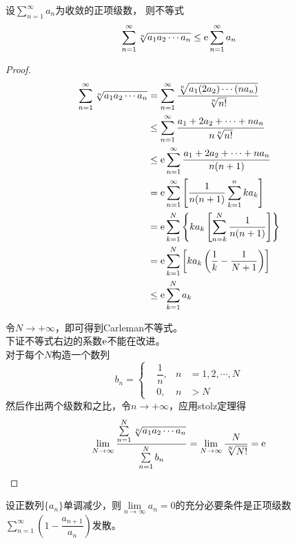 \begin{proposition}[Carleman不等式]

    设$\sum\limits_{n = 1}^{\infty}{a_n}$为收敛的正项级数，
    则不等式
    $$\sum\limits_{n = 1}^{\infty}{\sqrt[n]{a_1 a_2 \cdots a_n}} \leq \mathrm{e} \sum\limits_{n = 1}^{\infty}{a_n}$$

\end{proposition}

\begin{proof}

    \begin{align*}
        \sum\limits_{n = 1}^{\infty}{\sqrt[n]{a_1 a_2 \cdots a_n}} & = \sum\limits_{n = 1}^{\infty}{\dfrac{\sqrt[n]{a_1 (2a_2) \cdots (na_n)}}{\sqrt[n]{n!}}} \\
        & \leq \sum\limits_{n = 1}^{\infty}{\dfrac{a_1 + 2a_2 + \cdots + na_n}{n\sqrt[n]{n!}}} \\
        & \leq \mathrm{e} \sum\limits_{n = 1}^{\infty}{\dfrac{a_1 + 2a_2 + \cdots + na_n}{n(n + 1)}} \\
        & = \mathrm{e} \sum\limits_{n = 1}^{\infty}{\left[ \dfrac{1}{n(n + 1)} \sum\limits_{k = 1}^{n}{ka_k} \right]} \\
        & = \mathrm{e} \sum\limits_{k = 1}^{N}{\left\{ ka_k\left[ \sum\limits_{n = k}^{N}{\dfrac{1}{n(n + 1)}} \right] \right\}} \\
        & = \mathrm{e} \sum\limits_{k = 1}^{N}{\left[ ka_k \left(\dfrac{1}{k} - \dfrac{1}{N + 1} \right) \right]} \\
        & \leq \mathrm{e} \sum\limits_{k = 1}^{N}{a_k}
    \end{align*}

    令$N\to+\infty$，即可得到\textup{Carleman}不等式。\\
    下证不等式右边的系数$\mathrm{e}$不能在改进。\\
    对于每个$N$构造一个数列
    $$b_n= \left\{
        \begin{aligned}
            & \dfrac{1}{n}, & n & = 1,2,\cdots,N \\
            & 0, & n & > N
        \end{aligned}
    \right.
    $$
    然后作出两个级数和之比，令$n\to+\infty$，应用\textup{stolz}定理得
    $$\lim\limits_{N \to \infty}{\dfrac{\sum\limits_{n = 1}^{N}{\sqrt[n]{a_1 a_2 \cdots a_n}}}{\sum\limits_{n = 1}^{N}{b_n}}} = \lim\limits_{N \to \infty}{\dfrac{N}{\sqrt[N]{N!}}} = \mathrm{e}$$

\end{proof}

\begin{theorem}[Sapagof判别法]

设正数列$\{a_n\}$单调减少，则$\lim\limits_{n \to \infty}{a_n} =  0$的充分必要条件是正项级数$\sum\limits_{n = 1}^{\infty}{\left( 1 - \dfrac{a_{n + 1}}{a_n} \right)}$发散。
    
\end{theorem}

